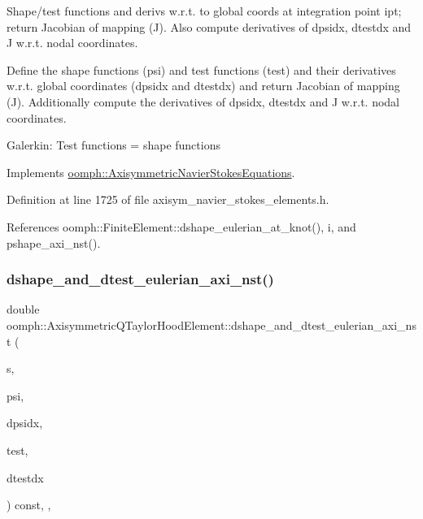 Shape/test functions and derivs w.\+r.\+t. to global coords at integration point ipt; return Jacobian of mapping (J). Also compute derivatives of dpsidx, dtestdx and J w.\+r.\+t. nodal coordinates. 

Define the shape functions (psi) and test functions (test) and their derivatives w.\+r.\+t. global coordinates (dpsidx and dtestdx) and return Jacobian of mapping (J). Additionally compute the derivatives of dpsidx, dtestdx and J w.\+r.\+t. nodal coordinates.

Galerkin\+: Test functions = shape functions 

Implements \hyperlink{classoomph_1_1AxisymmetricNavierStokesEquations_a2cd0715a679af81bd0e3d7448a5560cb}{oomph\+::\+Axisymmetric\+Navier\+Stokes\+Equations}.



Definition at line 1725 of file axisym\+\_\+navier\+\_\+stokes\+\_\+elements.\+h.



References oomph\+::\+Finite\+Element\+::dshape\+\_\+eulerian\+\_\+at\+\_\+knot(), i, and pshape\+\_\+axi\+\_\+nst().

\mbox{\label{classoomph_1_1AxisymmetricQTaylorHoodElement_a413aba20f944dc30c84bb432c408cbc1}} 
\subsubsection{\texorpdfstring{dshape\+\_\+and\+\_\+dtest\+\_\+eulerian\+\_\+axi\+\_\+nst()}{dshape\_and\_dtest\_eulerian\_axi\_nst()}}
{\footnotesize\ttfamily double oomph\+::\+Axisymmetric\+Q\+Taylor\+Hood\+Element\+::dshape\+\_\+and\+\_\+dtest\+\_\+eulerian\+\_\+axi\+\_\+nst (\begin{DoxyParamCaption}\item[{const \hyperlink{classoomph_1_1Vector}{Vector}$<$ double $>$ \&}]{s,  }\item[{\hyperlink{classoomph_1_1Shape}{Shape} \&}]{psi,  }\item[{\hyperlink{classoomph_1_1DShape}{D\+Shape} \&}]{dpsidx,  }\item[{\hyperlink{classoomph_1_1Shape}{Shape} \&}]{test,  }\item[{\hyperlink{classoomph_1_1DShape}{D\+Shape} \&}]{dtestdx }\end{DoxyParamCaption}) const\hspace{0.3cm}{\ttfamily [inline]}, {\ttfamily [protected]}, {\ttfamily [virtual]}}



